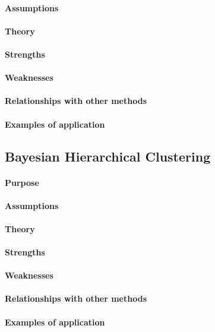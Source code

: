 \paragraph{Assumptions}
\paragraph{Theory}
\paragraph{Strengths}
\paragraph{Weaknesses}
\paragraph{Relationships with other methods}
\paragraph{Examples of application}

\subsection{Bayesian Hierarchical Clustering}
\paragraph{Purpose}
\paragraph{Assumptions}
\paragraph{Theory}
\paragraph{Strengths}
\paragraph{Weaknesses}
\paragraph{Relationships with other methods}
\paragraph{Examples of application}


